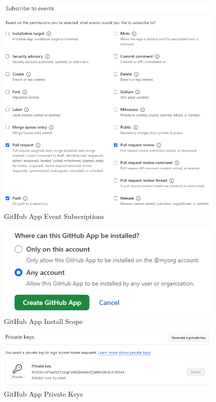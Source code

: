 \begin{figure}[ht]
    \includegraphics[width=\textwidth]{graphics/gh-app-cfg-4.png}
    \caption{GitHub App Event Subscriptions}
    \label{fig:gh-app-cfg-4}
\end{figure}

\begin{figure}[ht]
    \includegraphics[width=\textwidth]{graphics/gh-app-cfg-5.png}
    \caption{GitHub App Install Scope}
    \label{fig:gh-app-cfg-5}
\end{figure}

\begin{figure}[ht]
    \includegraphics[width=\textwidth]{graphics/gh-app-cfg-6.png}
    \caption{GitHub App Private Keys}
    \label{fig:gh-app-cfg-6}
\end{figure}

